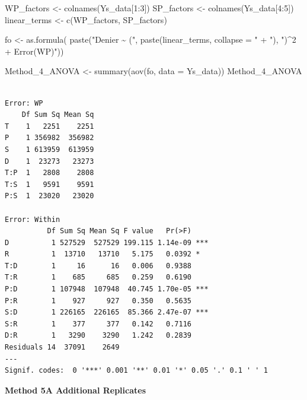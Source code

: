 \documentclass[
  letterpaper,
  DIV=11,
  numbers=noendperiod]{scrartcl}
\newenvironment{Shaded}{\begin{snugshade}}{\end{snugshade}}
\newcommand{\AttributeTok}[1]{\textcolor[rgb]{0.40,0.45,0.13}{#1}}
\newcommand{\DecValTok}[1]{\textcolor[rgb]{0.68,0.00,0.00}{#1}}
\newcommand{\FunctionTok}[1]{\textcolor[rgb]{0.28,0.35,0.67}{#1}}
\newcommand{\NormalTok}[1]{\textcolor[rgb]{0.00,0.23,0.31}{#1}}
\newcommand{\OtherTok}[1]{\textcolor[rgb]{0.00,0.23,0.31}{#1}}
\newcommand{\SpecialCharTok}[1]{\textcolor[rgb]{0.37,0.37,0.37}{#1}}
\newcommand{\StringTok}[1]{\textcolor[rgb]{0.13,0.47,0.30}{#1}}
\begin{document}
\begin{Shaded}
\begin{Highlighting}[]
\NormalTok{WP\_factors }\OtherTok{\textless{}{-}} \FunctionTok{colnames}\NormalTok{(Ys\_data[}\DecValTok{1}\SpecialCharTok{:}\DecValTok{3}\NormalTok{])}
\NormalTok{SP\_factors }\OtherTok{\textless{}{-}} \FunctionTok{colnames}\NormalTok{(Ys\_data[}\DecValTok{4}\SpecialCharTok{:}\DecValTok{5}\NormalTok{])}
\NormalTok{linear\_terms }\OtherTok{\textless{}{-}} \FunctionTok{c}\NormalTok{(WP\_factors, SP\_factors)}

\NormalTok{fo }\OtherTok{\textless{}{-}} \FunctionTok{as.formula}\NormalTok{(}
  \FunctionTok{paste}\NormalTok{(}\StringTok{"Denier \textasciitilde{} ("}\NormalTok{, }\FunctionTok{paste}\NormalTok{(linear\_terms, }\AttributeTok{collapse =} \StringTok{" + "}\NormalTok{), }\StringTok{")\^{}2 + Error(WP)"}\NormalTok{))}

\NormalTok{Method\_4\_ANOVA }\OtherTok{\textless{}{-}} \FunctionTok{summary}\NormalTok{(}\FunctionTok{aov}\NormalTok{(fo, }\AttributeTok{data =}\NormalTok{ Ys\_data))}
\NormalTok{Method\_4\_ANOVA}
\end{Highlighting}
\end{Shaded}

\begin{verbatim}

Error: WP
    Df Sum Sq Mean Sq
T    1   2251    2251
P    1 356982  356982
S    1 613959  613959
D    1  23273   23273
T:P  1   2808    2808
T:S  1   9591    9591
P:S  1  23020   23020

Error: Within
          Df Sum Sq Mean Sq F value   Pr(>F)    
D          1 527529  527529 199.115 1.14e-09 ***
R          1  13710   13710   5.175   0.0392 *  
T:D        1     16      16   0.006   0.9388    
T:R        1    685     685   0.259   0.6190    
P:D        1 107948  107948  40.745 1.70e-05 ***
P:R        1    927     927   0.350   0.5635    
S:D        1 226165  226165  85.366 2.47e-07 ***
S:R        1    377     377   0.142   0.7116    
D:R        1   3290    3290   1.242   0.2839    
Residuals 14  37091    2649                     
---
Signif. codes:  0 '***' 0.001 '**' 0.01 '*' 0.05 '.' 0.1 ' ' 1
\end{verbatim}

\textbf{Method 5A Additional Replicates}
\end{document}
